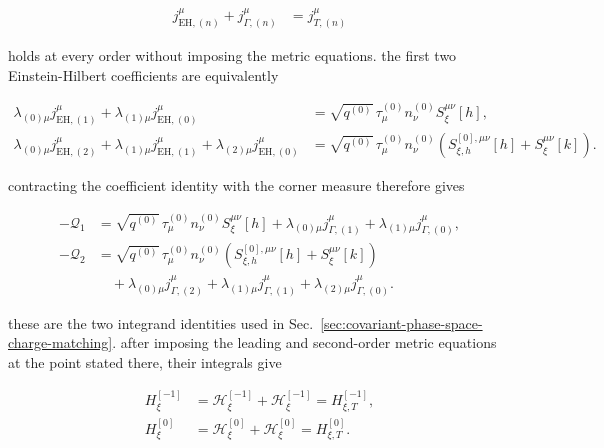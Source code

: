 \begin{align}
j_{\mathrm{EH},(n)}^{\mu}+j_{\Gamma,(n)}^{\mu} & =j_{T,(n)}^{\mu}
\end{align}

holds at every order without imposing the metric equations. the first two Einstein-Hilbert coefficients are equivalently

\[\begin{aligned}
\lambda _{(0)\mu}j_{\mathrm{EH},(1)}^{\mu}+\lambda _{(1)\mu}j_{\mathrm{EH},(0)}^{\mu} & =\sqrt{q^{(0)}}\,\tau _{\mu}^{(0)}n_{\nu}^{(0)}S_{\xi}^{\mu \nu}[h], \\
\lambda _{(0)\mu}j_{\mathrm{EH},(2)}^{\mu}+\lambda _{(1)\mu}j_{\mathrm{EH},(1)}^{\mu}+\lambda _{(2)\mu}j_{\mathrm{EH},(0)}^{\mu} & =\sqrt{q^{(0)}}\,\tau _{\mu}^{(0)}n_{\nu}^{(0)}\left(S_{\xi,h}^{[0],\mu \nu}[h]+S_{\xi}^{\mu \nu}[k]\right).
\end{aligned}\]

contracting the coefficient identity with the corner measure therefore gives

\[\begin{aligned}
-\mathcal{Q}_{1} & =\sqrt{q^{(0)}}\,\tau _{\mu}^{(0)}n_{\nu}^{(0)}S_{\xi}^{\mu \nu}[h]+\lambda _{(0)\mu}j_{\Gamma,(1)}^{\mu}+\lambda _{(1)\mu}j_{\Gamma,(0)}^{\mu}, \\
-\mathcal{Q}_{2} & =\sqrt{q^{(0)}}\,\tau _{\mu}^{(0)}n_{\nu}^{(0)}\left(S_{\xi,h}^{[0],\mu \nu}[h]+S_{\xi}^{\mu \nu}[k]\right) \\
&\quad+\lambda _{(0)\mu}j_{\Gamma,(2)}^{\mu}+\lambda _{(1)\mu}j_{\Gamma,(1)}^{\mu}+\lambda _{(2)\mu}j_{\Gamma,(0)}^{\mu}.
\end{aligned}\]

these are the two integrand identities used in Sec.~\ref{sec:covariant-phase-space-charge-matching}. after imposing the leading and second-order metric equations at the point stated there, their integrals give

\begin{align}
H_{\xi}^{[-1]} & =\mathcal{H}_{\xi}^{[-1]}+\mathscr{H}_{\xi}^{[-1]}=H_{\xi,T}^{[-1]}, \\
H_{\xi}^{[0]} & =\mathcal{H}_{\xi}^{[0]}+\mathscr{H}_{\xi}^{[0]}=H_{\xi,T}^{[0]}.
\end{align}
